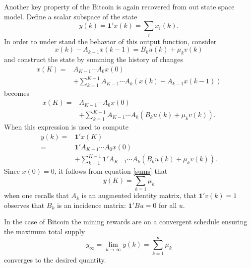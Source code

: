 \documentclass[letterpaper, 10 pt, conference]{ieeeconf}  %
\begin{document}
Another key property of the Bitcoin is again recovered from out state space model. Define a scalar subspace of the state
\begin{equation}
y(k) = \mathbf{1}'x(k) =\sum_i x_i(k).
\end{equation}
In order to under stand the behavior of this output function, consider
\begin{equation}
    x(k)-A_{k-1}x(k-1) = B_k u(k) + \mu_k v(k)
\end{equation}
and construct the state by summing the history of changes
\begin{equation}
\begin{split}
    x(K) = & A_{K-1}\cdots A_0 x(0)\\
    &+ \sum_{k=1}^{K-1} A_{K-1}\cdots A_{k} \left(x(k)-A_{k-1}x(k-1)\right)
\end{split}
\end{equation}
becomes
\begin{equation}
\begin{split}
    x(K) = & A_{K-1}\cdots A_0 x(0)\\ & + \sum_{k=1}^{K-1} A_{K-1}\cdots A_{k} \left(B_k u(k) + \mu_k v(k)\right).
    \end{split}
\end{equation}
When this expression is used to compute
\begin{equation}
    \begin{split}
    y(k) = &\mathbf{1}' x(K) \\
    =& \mathbf{1}'A_{K-1}\cdots A_0 x(0)\\ 
    &+ \sum_{k=1}^{K-1} \mathbf{1}'A_{K-1}\cdots A_{k} \left(B_k u(k) + \mu_k v(k)\right).
    \end{split}
\end{equation}
Since $x(0)=0$, it follows from equation \eqref{sums} that
\begin{equation}
y(K) = \sum_{k=1} \mu_k
\end{equation}
when one recalls that $A_k$ is an augmented identity matrix, that $\mathbf{1}'v(k)=1$ observes that $B_k$ is an incidence matrix: $\mathbf{1}'Bu = 0$ for all $u$. 


In the case of Bitcoin the mining rewards are on a convergent schedule ensuring the maximum total supply
\begin{equation}
y_\infty = \lim_{k\rightarrow \infty} y(k) = \sum_{k=1}^{\infty} \mu_k
\end{equation}
converges to the desired quantity. 
\end{document}
